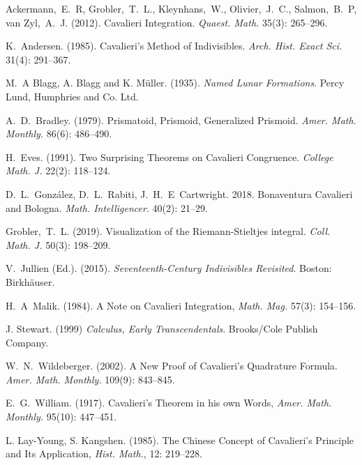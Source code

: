 \documentclass{article}
\theoremstyle{theorem}
\theoremstyle{definition}
\begin{document}
\begin{thebibliography}{1}

 Ackermann,~E.~R, Grobler,~T.~L., Kleynhans,~W., Olivier,~J.~C., Salmon,~B.~P, van Zyl,~A.~J. (2012). Cavalieri
Integration. \textit{Quaest. Math.} 35(3): 265–296.

K.~Andersen. (1985). Cavalieri's Method of Indivisibles. \emph{Arch. Hist. Exact Sci.} 31(4): 291--367.

M.~A Blagg, A. Blagg and K. M{\"u}ller. (1935). \emph{Named Lunar Formations}. Percy Lund, Humphries and Co. Ltd.

A.~D.~Bradley. (1979). Prismatoid, Prismoid, Generalized Prismoid. \emph{Amer. Math. Monthly.} 86(6): 486--490.

H.~Eves. (1991). Two Surprising Theorems on Cavalieri Congruence. \emph{College Math. J.} 22(2): 118--124.

 D.~L.~Gonz{\'a}lez, D.~L.~Rabiti, J.~H.~E~Cartwright. 2018. Bonaventura Cavalieri and Bologna. \emph{Math. Intelligencer}. 40(2): 21--29.

 Grobler,~T.~L. (2019). Visualization of the Riemann-Stieltjes integral. \textit{Coll. Math. J.} 50(3): 198--209.

 V.~Jullien (Ed.). (2015). \emph{Seventeenth-Century Indivisibles Revisited}. Boston: Birkh{\"a}user.

H.~A~Malik. (1984). A Note on Cavalieri Integration, \emph{Math. Mag.} 57(3): 154--156.

J. Stewart. (1999) \emph{Calculus, Early Transcendentals}. Brooks/Cole Publish Company. 

W.~N.~Wildeberger. (2002). A New Proof of Cavalieri's Quadrature Formula. \emph{Amer. Math. Monthly.} 109(9): 843--845.

E.~G.~William. (1917). Cavalieri's Theorem in his own Words, \emph{Amer. Math. Monthly.} 95(10): 447--451.

L. Lay-Young, S. Kangshen. (1985). The Chinese Concept of Cavalieri's Principle and Its Application, \emph{Hist. Math.}, 12: 219--228.

\end{thebibliography}
\vfill\eject
\end{document}
